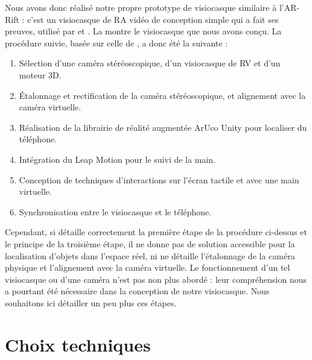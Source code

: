 Nous avons donc réalisé notre propre prototype de visiocasque similaire à l'AR-Rift \citep{Steptoe2013} : c'est un visiocasque de RA vidéo de conception simple qui a fait ses preuves, utilisé par \cite{Steptoe2014} et \cite{Piumsomboon2014}. La  montre le visiocasque que nous avons conçu. La procédure suivie, basée sur celle de \cite{Steptoe2013}, a donc été la suivante :
\begin{enumerate}
  \item Sélection d'une caméra stéréoscopique, d'un visiocasque de RV et d'un moteur 3D.
  \item Étalonnage et rectification de la caméra stéréoscopique, et alignement avec la caméra virtuelle.
  \item Réalisation de la librairie de réalité augmentée ArUco Unity pour localiser du téléphone.
  \item Intégration du Leap Motion pour le suivi de la main.
  \item Conception de techniques d'interactions sur l'écran tactile et avec une main virtuelle.
  \item Synchronisation entre le visiocasque et le téléphone.
\end{enumerate}

Cependant, si \cite{Steptoe2013} détaille correctement la première étape de la procédure ci-dessus et le principe de la troisième étape, il ne donne pas de solution accessible pour la localisation d'objets dans l'espace réel, ni ne détaille l'étalonnage de la caméra physique et l'alignement avec la caméra virtuelle. Le fonctionnement d'un tel visiocasque ou d'une caméra n'est pas non plus abordé : leur compréhension nous a pourtant été nécessaire dans la conception de notre visiocasque. Nous souhaitons ici détailler un peu plus ces étapes.



\section{Choix techniques}
\label{sec:technical_choices}

